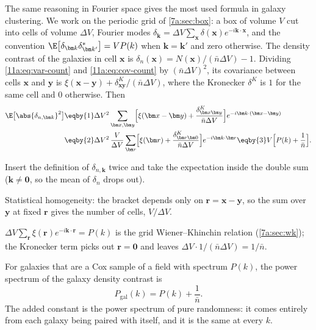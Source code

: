 The same reasoning in Fourier space gives the most used formula in galaxy
clustering. We work on the periodic grid of \cref{7a:sec:box}: a box of volume
$V$ cut into cells of volume $\Delta V$, Fourier modes
$\delta_{\bm k}=\Delta V\sum_{\bm x}\delta(\bm x)e^{-i\bm k\cdot\bm x}$, and the
convention $\E\bigl[\delta_{\bm k}\delta^*_{\bm k'}\bigr]=V P(k)$ when
$\bm k=\bm k'$ and zero otherwise. The density contrast of the galaxies in cell
$\bm x$ is $\delta_n(\bm x)=N(\bm x)/(\bar n\Delta V)-1$. Dividing
\eqref{11a:eq:var-count} and \eqref{11a:eq:cov-count} by $(\bar n\Delta V)^2$,
its covariance between cells $\bm x$ and $\bm y$ is
$\xi(\bm x-\bm y)+\delta^K_{\bm x\bm y}/(\bar n\Delta V)$, where the Kronecker
$\delta^K$ is $1$ for the same cell and $0$ otherwise. Then
\begin{align}
  \E\bigl[\abs{\delta_{n,\bm k}}^2\bigr]
  &\eqby{1} \Delta V^2\sum_{\bm x,\bm y}
     \Bigl[\xi(\bm x-\bm y)+\frac{\delta^K_{\bm x\bm y}}{\bar n\Delta V}\Bigr]
     e^{-i\bm k\cdot(\bm x-\bm y)} \nonumber\\
  &\eqby{2} \Delta V^2\,\frac{V}{\Delta V}\sum_{\bm r}
     \Bigl[\xi(\bm r)+\frac{\delta^K_{\bm r\bm 0}}{\bar n\Delta V}\Bigr]e^{-i\bm k\cdot\bm r}
   \eqby{3} V\Bigl[P(k)+\frac{1}{\bar n}\Bigr]. \label{11a:eq:shot}
\end{align}
\begin{explain}
  \item Insert the definition of $\delta_{n,\bm k}$ twice and take the
        expectation inside the double sum ($\bm k\neq\bm0$, so the mean of
        $\delta_n$ drops out).
  \item Statistical homogeneity: the bracket depends only on $\bm r=\bm x-\bm y$,
        so the sum over $\bm y$ at fixed $\bm r$ gives the number of cells,
        $V/\Delta V$.
  \item $\Delta V\sum_{\bm r}\xi(\bm r)e^{-i\bm k\cdot\bm r}=P(k)$ is the grid
        Wiener--Khinchin relation (\cref{7a:sec:wk}); the Kronecker term picks
        out $\bm r=\bm 0$ and leaves $\Delta V\cdot1/(\bar n\Delta V)=1/\bar n$.
\end{explain}

\begin{keyidea}
For galaxies that are a Cox sample of a field with spectrum $P(k)$, the power
spectrum of the galaxy density contrast is
\[
  P_{\text{gal}}(k)=P(k)+\frac{1}{\bar n}.
\]
The added constant is the power spectrum of pure randomness: it comes entirely
from each galaxy being paired with itself, and it is the same at every $k$.
\end{keyidea}

